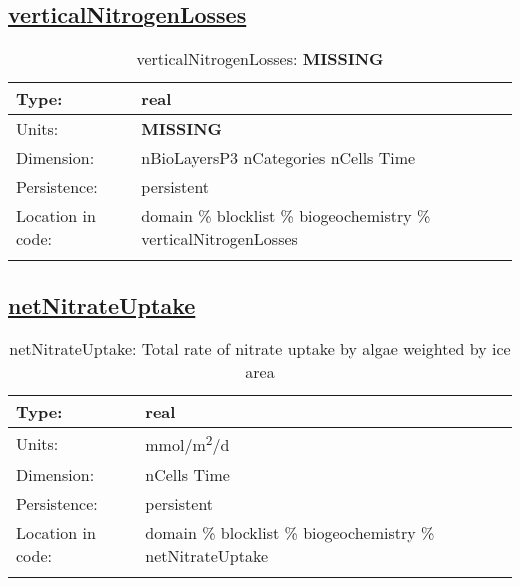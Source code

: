 \subsection[verticalNitrogenLosses]{\hyperref[sec:var_tab_biogeochemistry]{verticalNitrogenLosses}}
\label{subsec:var_sec_biogeochemistry_verticalNitrogenLosses}
\begin{center}
\begin{longtable}{| p{2.0in} | p{4.0in} |}
        \hline 
        Type: & real \\
        \hline 
        Units: & {\bf \color{red} MISSING} \\
        \hline 
        Dimension: & nBioLayersP3 nCategories nCells Time \\
        \hline 
        Persistence: & persistent \\
        \hline 
         Location in code: & domain \% blocklist \% biogeochemistry \% verticalNitrogenLosses \\
         \hline 
    \caption{verticalNitrogenLosses: {\bf \color{red} MISSING}}
\end{longtable}
\end{center}
\subsection[netNitrateUptake]{\hyperref[sec:var_tab_biogeochemistry]{netNitrateUptake}}
\label{subsec:var_sec_biogeochemistry_netNitrateUptake}
\begin{center}
\begin{longtable}{| p{2.0in} | p{4.0in} |}
        \hline 
        Type: & real \\
        \hline 
        Units: & \si{mmol/m^2/d} \\
        \hline 
        Dimension: & nCells Time \\
        \hline 
        Persistence: & persistent \\
        \hline 
         Location in code: & domain \% blocklist \% biogeochemistry \% netNitrateUptake \\
         \hline 
    \caption{netNitrateUptake: Total rate of nitrate uptake by algae weighted by ice area}
\end{longtable}
\end{center}
